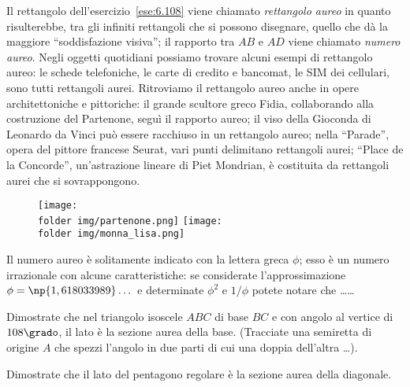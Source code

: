 Il rettangolo dell'esercizio~\ref{ese:6.108} viene chiamato 
\emph{rettangolo aureo} in quanto risulterebbe, tra gli infiniti 
rettangoli che si possono disegnare, quello che dà la maggiore 
``soddisfazione visiva''; il rapporto tra $AB$ e $AD$ viene chiamato 
\emph{numero aureo}. 
Negli oggetti quotidiani possiamo trovare alcuni esempi di rettangolo 
aureo: le schede telefoniche, le carte di credito e bancomat, le SIM 
dei cellulari, sono tutti rettangoli aurei.
Ritroviamo il rettangolo aureo anche in opere architettoniche e 
pittoriche: il grande scultore greco Fidia, collaborando alla 
costruzione del Partenone, seguì il rapporto aureo; il viso della 
Gioconda di Leonardo da Vinci può essere racchiuso in un rettangolo 
aureo; nella ``Parade'', opera del pittore francese Seurat, vari 
punti delimitano rettangoli aurei; ``Place de la Concorde'', 
un'astrazione lineare di Piet Mondrian, è costituita da rettangoli 
aurei che si sovrappongono.

\begin{figure*}[!htb]
	
\centering\texttt{[image: \\folder img/partenone.png]}
\qquad\texttt{[image: \\folder img/monna\_lisa.png]}
\end{figure*}

\begin{esercizio}
\label{ese:6.109}
Il numero aureo è solitamente indicato con la lettera greca $\phi$; 
esso è un numero irrazionale con alcune caratteristiche: se 
considerate l'approssimazione $\phi=\np{1,618033989}\ldots{}$ e 
determinate $\phi^2$ e $1/\phi$ potete notare che \ldots\ldots{}
\end{esercizio}

\begin{esercizio}
\label{ese:6.110}
Dimostrate che nel triangolo isoscele $ABC$ di base $BC$ e con angolo 
al vertice di $108\grado$, il lato è la sezione aurea della base. 
(Tracciate una semiretta di origine $A$ che spezzi l'angolo in due 
parti di cui una doppia dell'altra \ldots{}).
\end{esercizio}

\begin{esercizio}
\label{ese:6.111}
Dimostrate che il lato del pentagono regolare è la sezione aurea 
della diagonale.
\end{esercizio}

